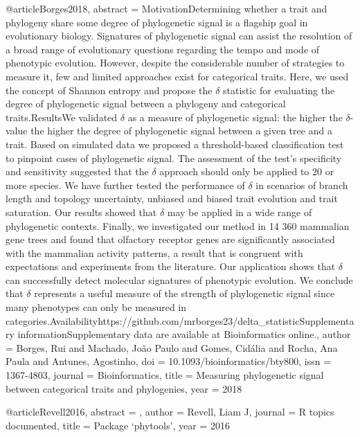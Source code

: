 {{{{{@article{Borges2018,
abstract = {MotivationDetermining whether a trait and phylogeny share some degree of phylogenetic signal is a flagship goal in evolutionary biology. Signatures of phylogenetic signal can assist the resolution of a broad range of evolutionary questions regarding the tempo and mode of phenotypic evolution. However, despite the considerable number of strategies to measure it, few and limited approaches exist for categorical traits. Here, we used the concept of Shannon entropy and propose the $\delta$ statistic for evaluating the degree of phylogenetic signal between a phylogeny and categorical traits.ResultsWe validated $\delta$ as a measure of phylogenetic signal: the higher the $\delta$-value the higher the degree of phylogenetic signal between a given tree and a trait. Based on simulated data we proposed a threshold-based classification test to pinpoint cases of phylogenetic signal. The assessment of the test's specificity and sensitivity suggested that the $\delta$ approach should only be applied to 20 or more species. We have further tested the performance of $\delta$ in scenarios of branch length and topology uncertainty, unbiased and biased trait evolution and trait saturation. Our results showed that $\delta$ may be applied in a wide range of phylogenetic contexts. Finally, we investigated our method in 14 360 mammalian gene trees and found that olfactory receptor genes are significantly associated with the mammalian activity patterns, a result that is congruent with expectations and experiments from the literature. Our application shows that $\delta$ can successfully detect molecular signatures of phenotypic evolution. We conclude that $\delta$ represents a useful measure of the strength of phylogenetic signal since many phenotypes can only be measured in categories.Availabilityhttps://github.com/mrborges23/delta_statisticSupplementary informationSupplementary data are available at Bioinformatics online.},
author = {Borges, Rui and Machado, Jo{\~{a}}o Paulo and Gomes, Cid{\'{a}}lia and Rocha, Ana Paula and Antunes, Agostinho},
doi = {10.1093/bioinformatics/bty800},
issn = {1367-4803},
journal = {Bioinformatics},
title = {{Measuring phylogenetic signal between categorical traits and phylogenies}},
year = {2018}
}

@article{Revell2016,
abstract = {},
author = {Revell, Liam J},
journal = {R topics documented},
title = {{Package ‘phytools'}},
year = {2016}
}

}}}}}
